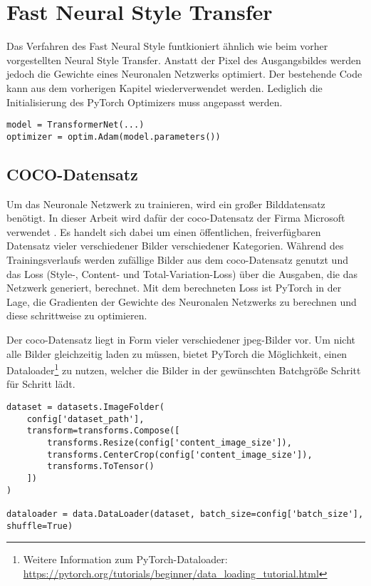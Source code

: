 \section{Fast Neural Style Transfer}

Das Verfahren des Fast Neural Style funtkioniert ähnlich wie beim vorher vorgestellten Neural Style Transfer. Anstatt der Pixel des Ausgangsbildes werden jedoch die Gewichte eines Neuronalen Netzwerks optimiert. Der bestehende Code kann aus  dem vorherigen Kapitel wiederverwendet werden. Lediglich die Initialisierung des PyTorch Optimizers muss angepasst werden.

\begin{listing}[H]
\begin{verbatim}
model = TransformerNet(...)
optimizer = optim.Adam(model.parameters())
\end{verbatim}
\end{listing}

\subsection{COCO-Datensatz}

Um das Neuronale Netzwerk zu trainieren, wird ein großer Bilddatensatz benötigt. In dieser Arbeit wird dafür der \gls{coco}-Datensatz der Firma Microsoft verwendet \cite{DBLP:journals/corr/LinMBHPRDZ14}. Es handelt sich dabei um einen öffentlichen, freiverfügbaren Datensatz vieler verschiedener Bilder verschiedener Kategorien. Während des Trainingsverlaufs werden zufällige Bilder aus dem \gls{coco}-Datensatz genutzt und das Loss  (Style-, Content- und Total-Variation-Loss) über die Ausgaben, die das Netzwerk generiert, berechnet. Mit dem berechneten Loss ist PyTorch in der Lage, die Gradienten der Gewichte des Neuronalen Netzwerks zu berechnen und diese schrittweise zu optimieren.

Der \gls{coco}-Datensatz liegt in Form vieler verschiedener \gls{jpeg}-Bilder vor. Um nicht alle Bilder gleichzeitig laden zu müssen, bietet PyTorch die Möglichkeit, einen Dataloader\footnote{Weitere Information zum PyTorch-Dataloader: \url{https://pytorch.org/tutorials/beginner/data_loading_tutorial.html}} zu nutzen, welcher die Bilder in der gewünschten Batchgröße Schritt für Schritt lädt.

\begin{listing}[H]
\begin{verbatim}
dataset = datasets.ImageFolder(
    config['dataset_path'],
    transform=transforms.Compose([
        transforms.Resize(config['content_image_size']),
        transforms.CenterCrop(config['content_image_size']),
        transforms.ToTensor()
    ])
)

dataloader = data.DataLoader(dataset, batch_size=config['batch_size'], shuffle=True)
\end{verbatim}
\end{listing}

